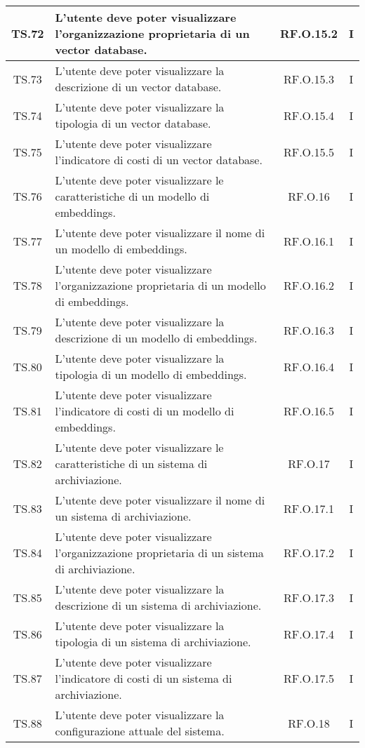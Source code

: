 {{{{{{{{{\begin{xltabular}{\textwidth}{|c|X|c|c|}
    \hline
    TS.72 & L’utente deve poter visualizzare l’organizzazione proprietaria di un vector database. & RF.O.15.2 & I \\
    \hline
    TS.73 & L’utente deve poter visualizzare la descrizione di un vector database. & RF.O.15.3 & I \\
    \hline
    TS.74 & L’utente deve poter visualizzare la tipologia di un vector database. & RF.O.15.4 & I \\
    \hline
    TS.75 & L’utente deve poter visualizzare l’indicatore di costi di un vector database. & RF.O.15.5 & I \\
    \hline
    TS.76 & L’utente deve poter visualizzare le caratteristiche di un modello di embeddings. & RF.O.16 & I \\
    \hline
    TS.77 & L’utente deve poter visualizzare il nome di un modello di embeddings. & RF.O.16.1 & I \\
    \hline
    TS.78 & L’utente deve poter visualizzare l’organizzazione proprietaria di un modello di embeddings. & RF.O.16.2 & I \\
    \hline
    TS.79 & L’utente deve poter visualizzare la descrizione di un modello di embeddings. & RF.O.16.3 & I \\
    \hline
    TS.80 & L’utente deve poter visualizzare la tipologia di un modello di embeddings. & RF.O.16.4 & I \\
    \hline
    TS.81 & L’utente deve poter visualizzare l’indicatore di costi di un modello di embeddings. & RF.O.16.5 & I \\
    \hline
    TS.82 & L’utente deve poter visualizzare le caratteristiche di un sistema di archiviazione. & RF.O.17 & I \\
    \hline
    TS.83 & L’utente deve poter visualizzare il nome di un sistema di archiviazione. & RF.O.17.1 & I \\
    \hline
    TS.84 & L’utente deve poter visualizzare l’organizzazione proprietaria di un sistema di archiviazione. & RF.O.17.2 & I \\
    \hline
    TS.85 & L’utente deve poter visualizzare la descrizione di un sistema di archiviazione. & RF.O.17.3 & I \\
    \hline
    TS.86 & L’utente deve poter visualizzare la tipologia di un sistema di archiviazione. & RF.O.17.4 & I \\
    \hline
    TS.87 & L’utente deve poter visualizzare l’indicatore di costi di un sistema di archiviazione. & RF.O.17.5 & I \\
    \hline
    TS.88 & L’utente deve poter visualizzare la configurazione attuale del sistema. & RF.O.18 & I \\

\end{xltabular}}}}}}}}}}
